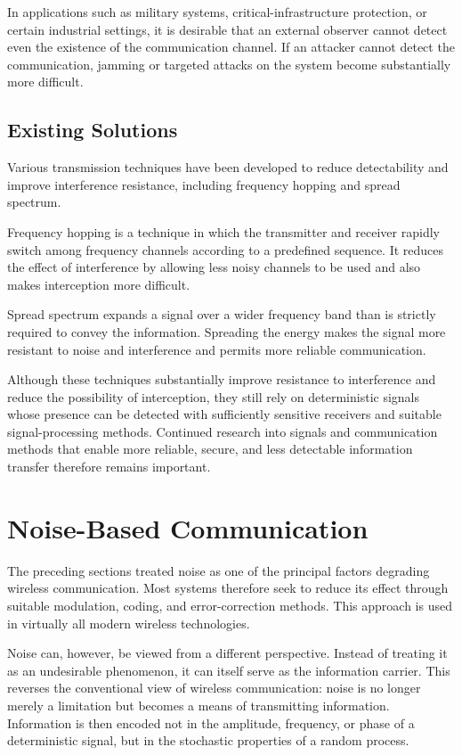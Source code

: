 \documentclass[a4paper, 12pt, openany]{book}
\begin{document}
In applications such as military systems, critical-infrastructure protection, or certain industrial settings, it is desirable that an external observer cannot detect even the existence of the communication channel. If an attacker cannot detect the communication, jamming or targeted attacks on the system become substantially more difficult.

\subsection{Existing Solutions}
Various transmission techniques have been developed to reduce detectability and improve interference resistance, including frequency hopping and spread spectrum.

Frequency hopping is a technique in which the transmitter and receiver rapidly switch among frequency channels according to a predefined sequence. It reduces the effect of interference by allowing less noisy channels to be used and also makes interception more difficult\cite{bluetoothAFH}.

Spread spectrum expands a signal over a wider frequency band than is strictly required to convey the information. Spreading the energy makes the signal more resistant to noise and interference and permits more reliable communication.


Although these techniques substantially improve resistance to interference and reduce the possibility of interception, they still rely on deterministic signals whose presence can be detected with sufficiently sensitive receivers and suitable signal-processing methods. Continued research into signals and communication methods that enable more reliable, secure, and less detectable information transfer therefore remains important.

\section{Noise-Based Communication}

The preceding sections treated noise as one of the principal factors degrading wireless communication. Most systems therefore seek to reduce its effect through suitable modulation, coding, and error-correction methods. This approach is used in virtually all modern wireless technologies.

Noise can, however, be viewed from a different perspective. Instead of treating it as an undesirable phenomenon, it can itself serve as the information carrier. This reverses the conventional view of wireless communication: noise is no longer merely a limitation but becomes a means of transmitting information. Information is then encoded not in the amplitude, frequency, or phase of a deterministic signal, but in the stochastic properties of a random process.
\end{document}
